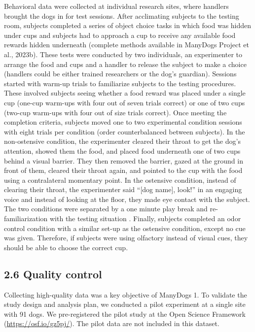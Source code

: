 \documentclass[
  pub,floatsintext]{apa6}
\begin{document}
Behavioral data were collected at individual research sites, where handlers brought the dogs in for test sessions. After acclimating subjects to the testing room, subjects completed a series of object choice tasks in which food was hidden under cups and subjects had to approach a cup to receive any available food rewards hidden underneath (complete methods available in ManyDogs Project et al., 2023b). These tests were conducted by two individuals, an experimenter to arrange the food and cups and a handler to release the subject to make a choice (handlers could be either trained researchers or the dog's guardian). Sessions started with warm-up trials to familiarize subjects to the testing procedures. These involved subjects seeing whether a food reward was placed under a single cup (one-cup warm-ups with four out of seven trials correct) or one of two cups (two-cup warm-ups with four out of size trials correct). Once meeting the completion criteria, subjects moved one to two experimental condition sessions with eight trials per condition (order counterbalanced between subjects). In the non-ostensive condition, the experimenter cleared their throat to get the dog's attention, showed them the food, and placed food underneath one of two cups behind a visual barrier. They then removed the barrier, gazed at the ground in front of them, cleared their throat again, and pointed to the cup with the food using a contralateral momentary point. In the ostensive condition, instead of clearing their throat, the experimenter said ``{[}dog name{]}, look!'' in an engaging voice and instead of looking at the floor, they made eye contact with the subject. The two conditions were separated by a one minute play break and re-familiarization with the testing situation . Finally, subjects completed an odor control condition with a similar set-up as the ostensive condition, except no cue was given. Therefore, if subjects were using olfactory instead of visual cues, they should be able to choose the correct cup.

\hypertarget{quality-control}{%
\subsection{2.6 Quality control}\label{quality-control}}

Collecting high-quality data was a key objective of ManyDogs 1. To validate the study design and analysis plan, we conducted a pilot experiment at a single site with 91 dogs. We pre-registered the pilot study at the Open Science Framework (\url{https://osf.io/gz5pj/}). The pilot data are not included in this dataset.
\end{document}
